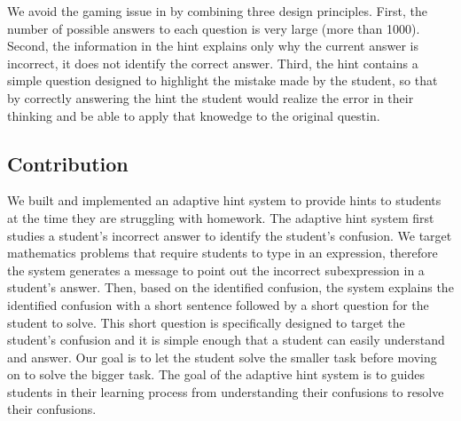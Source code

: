 \documentclass{llncs2e/llncs}
\begin{document}
We avoid the gaming issue in by combining three design principles.
First, the number of possible answers to each question is very large
(more than 1000). Second, the information in the hint explains only
why the current answer is incorrect, it does not identify the correct
answer. Third, the hint contains a simple question designed to
highlight the mistake made by the student, so that by correctly
answering the hint the student would realize the error in their
thinking and be able to apply that knowedge to the original questin.

\subsection*{Contribution}
We built and implemented an adaptive hint system to provide hints to students at the time they are struggling with homework. The adaptive hint system first studies a student's incorrect answer to identify the student's confusion. We target mathematics problems that require students to type in an expression, therefore the system generates a message to point out the incorrect subexpression in a student's answer. Then, based on the identified confusion, the system explains the identified confusion with a short sentence followed by a short question for the student to solve. This short question is specifically designed to target the student's confusion and it is simple enough that a student can easily understand and answer. Our goal is to let the student solve the smaller task before moving on to solve the bigger task. The goal of the adaptive hint system is to guides students in their learning process from understanding their confusions to resolve their confusions.
\end{document}
